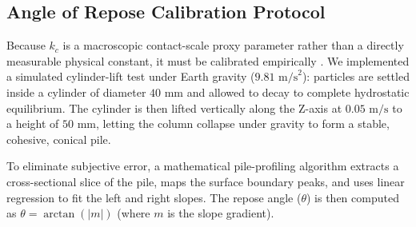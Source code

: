 \documentclass[preprint,12pt,authoryear]{elsarticle}
\begin{document}
\begin{table}[htbp]
\centering
\caption{DEM Simulation Parameters for LMS-1 Lunar Simulant}
\vspace{0.15cm}
\label{tab:material_properties}
\end{table}

\subsection{Angle of Repose Calibration Protocol}
Because $k_c$ is a macroscopic contact-scale proxy parameter rather than a directly measurable physical constant, it must be calibrated empirically \citep{Coetzee2017, Lommen2014}. We implemented a simulated cylinder-lift test under Earth gravity ($9.81\text{ m/s}^2$): particles are settled inside a cylinder of diameter $40\text{ mm}$ and allowed to decay to complete hydrostatic equilibrium. The cylinder is then lifted vertically along the Z-axis at $0.05\text{ m/s}$ to a height of $50\text{ mm}$, letting the column collapse under gravity to form a stable, cohesive, conical pile.

To eliminate subjective error, a mathematical pile-profiling algorithm extracts a cross-sectional slice of the pile, maps the surface boundary peaks, and uses linear regression to fit the left and right slopes. The repose angle ($\theta$) is then computed as $\theta = \arctan(|m|)$ (where $m$ is the slope gradient).
\end{document}

